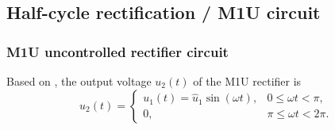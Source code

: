 \subsection{Half-cycle rectification / M1U circuit} 

\begin{frame}
    \frametitle{M1U uncontrolled rectifier circuit}
    Based on , the output voltage $u_2(t)$ of the M1U rectifier is
    \begin{equation}
        u_2(t) = \begin{cases}
            u_1(t)=\hat{u}_1 \sin(\omega t), & 0\leq \omega t < \pi, \\
            0, & \pi \leq \omega t < 2\pi.
        \end{cases}
        \label{eq:u2_M1U}
    \end{equation}


\end{frame}
